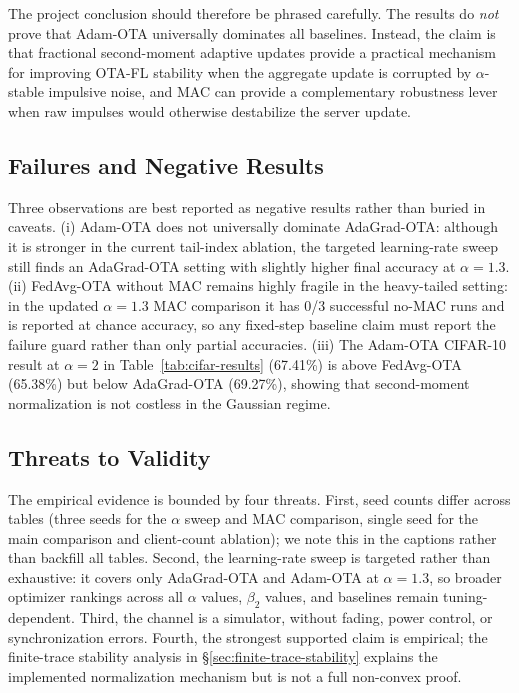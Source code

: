 The project conclusion should therefore be phrased carefully. The
results do \emph{not} prove that Adam-OTA universally dominates all
baselines. Instead, the claim is that fractional second-moment adaptive
updates provide a practical mechanism for improving OTA-FL stability
when the aggregate update is corrupted by $\alpha$-stable impulsive
noise, and MAC can provide a complementary robustness lever when raw
impulses would otherwise destabilize the server update.

\subsection{Failures and Negative Results}
Three observations are best reported as negative results rather than
buried in caveats. (i) Adam-OTA does not universally dominate AdaGrad-OTA:
although it is stronger in the current tail-index ablation, the targeted
learning-rate sweep still finds an AdaGrad-OTA setting with slightly higher
final accuracy at $\alpha=1.3$. (ii) FedAvg-OTA without MAC remains highly
fragile in the heavy-tailed setting: in the updated $\alpha=1.3$ MAC
comparison it has 0/3 successful no-MAC runs and is reported at chance
accuracy, so any fixed-step baseline claim must report the failure guard
rather than only partial accuracies.
(iii) The Adam-OTA CIFAR-10
result at $\alpha=2$ in
Table~\ref{tab:cifar-results} (67.41\%) is above FedAvg-OTA (65.38\%) but
below AdaGrad-OTA (69.27\%), showing that second-moment normalization is not
costless in the Gaussian regime.

\subsection{Threats to Validity}
\label{sec:threats-validity}
The empirical evidence is bounded by four threats. First, seed counts
differ across tables (three seeds for the $\alpha$ sweep and MAC
comparison, single seed for the main comparison and client-count
ablation); we note this in the captions rather than backfill all
tables. Second, the learning-rate sweep is targeted rather than exhaustive:
it covers only AdaGrad-OTA and Adam-OTA at $\alpha=1.3$, so broader optimizer
rankings across all $\alpha$ values, $\beta_2$ values, and baselines remain
tuning-dependent. Third, the channel is a simulator, without fading, power
control, or synchronization errors. Fourth, the strongest supported claim is
empirical; the finite-trace stability analysis in
\S\ref{sec:finite-trace-stability} explains the implemented
normalization mechanism but is not a full non-convex proof.
